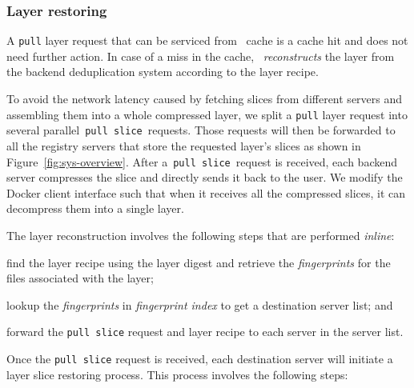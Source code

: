 \subsubsection{Layer restoring}
A \texttt{pull} layer request that can be serviced from 
\sysname~cache is a cache hit and does not need further action. 
In case of a miss in the cache, 
 \sysname~\emph{reconstructs} the layer from the backend deduplication
 system according to the layer recipe.
%
%

To avoid the network latency caused by fetching slices from different servers and
assembling them into a whole compressed layer, we split a \texttt{pull} layer request 
into several parallel~\texttt{pull slice}~requests. 
Those requests will then be
forwarded to all the registry servers that store the requested
layer's slices as shown in Figure~\ref{fig:sys-overview}. 
After a~\texttt{pull slice}~request is received, each backend server compresses the slice 
and directly sends it back to the user.
We modify the Docker client
interface such that when it receives all the compressed slices, it can
decompress them into a single layer. 

The layer reconstruction involves the following steps that are performed \emph{inline}:

\begin{compactenumerate}
	\item find the layer recipe using the layer digest and retrieve the 
\emph{fingerprints} for the files associated with the layer;
	\item lookup the \emph{fingerprints} in \emph{fingerprint index} to get a destination server list; and
	\item forward the \texttt{pull slice} %
	request and layer recipe to each server in the server list.
\end{compactenumerate}

Once the \texttt{pull slice} 
request is received, each destination server will initiate a layer slice restoring process. This process involves the following steps: 

